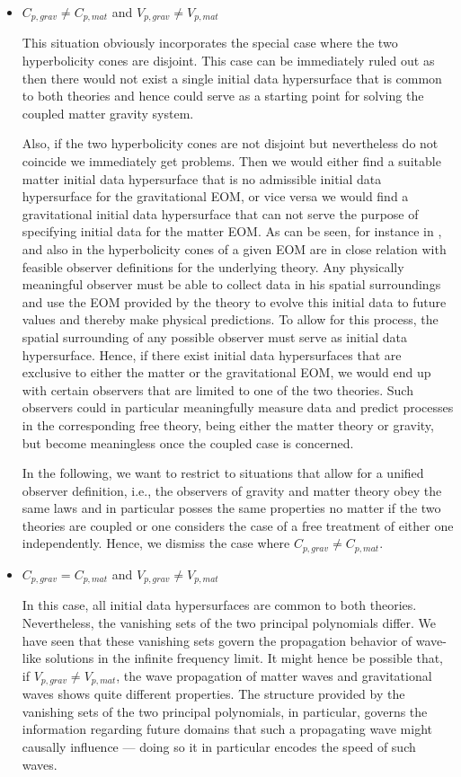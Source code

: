 \begin{itemize}
    \item $C_{p,grav} \neq C_{p,mat}$ and $V_{p,grav} \neq V_{p,mat}$
    
This situation obviously incorporates the special case where the two hyperbolicity cones are disjoint. This case can be immediately ruled out as then there would not exist a single initial data hypersurface that is common to both theories and hence could serve as a starting point for solving the coupled matter gravity system.   

Also, if the two hyperbolicity cones are not disjoint but nevertheless do not coincide we immediately get problems. Then we would either find a suitable matter initial data hypersurface that is no admissible initial data hypersurface for the gravitational EOM, or vice versa we would find a gravitational initial data hypersurface that can not serve the purpose of specifying initial data for the matter EOM. As can be seen, for instance in \cite{Rivera}, and also in \cite{2011PhRvD..83d4047R} the hyperbolicity cones of a given EOM are in close relation with feasible observer definitions for the underlying theory. Any physically meaningful observer must be able to collect data in his spatial surroundings and use the EOM provided by the theory to evolve this initial data to future values and thereby make physical predictions. To allow for this process, the spatial surrounding of any possible observer must serve as initial data hypersurface. Hence, if there exist initial data hypersurfaces that are exclusive to either the matter or the gravitational EOM, we would end up with certain observers that are limited to one of the two theories. Such observers could in particular meaningfully measure data and predict processes in the corresponding free theory, being either the matter theory or gravity, but become meaningless once the coupled case is concerned.

In the following, we want to restrict to situations that allow for a unified observer definition, i.e., the observers of gravity and matter theory obey the same laws and in particular posses the same properties no matter if the two theories are coupled or one considers the case of a free treatment of either one independently. Hence, we dismiss the case where $C_{p,grav} \neq C_{p,mat}$.

\item $C_{p,grav} = C_{p,mat}$ and $V_{p,grav} \neq V_{p,mat}$ 

In this case, all initial data hypersurfaces are common to both theories. Nevertheless, the vanishing sets of the two principal polynomials differ. We have seen that these vanishing sets govern the propagation behavior of wave-like solutions in the infinite frequency limit. It might hence be possible that, if $V_{p,grav} \neq V_{p,mat}$, the wave propagation of matter waves and gravitational waves shows quite different properties. The structure provided by the vanishing sets of the two principal polynomials, in particular, governs the information regarding future domains that such a propagating wave might causally influence — doing so it in  particular encodes the speed of such waves. 


\end{itemize}
